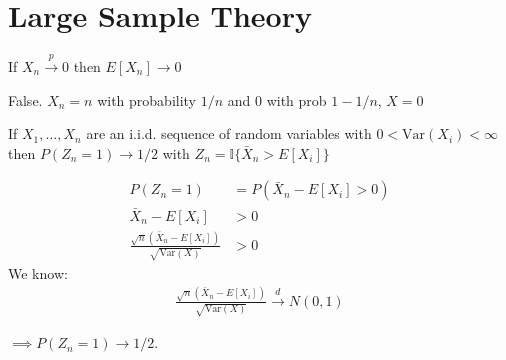 \documentclass{exam}
\begin{document}
    


\section{Large Sample Theory}
\begin{questions}
    
\question If $X_n \xrightarrow{p} 0$ then $E[X_n] \rightarrow 0$
\begin{solution}
False. $X_n = n$ with probability $1/n$ and 0 with prob $1 - 1/n$,  $X = 0$
\end{solution}



\question If $X_1,...,X_n$ are an i.i.d. sequence of random variables with $0 < \text{Var}(X_i) < \infty$ then 
$P(Z_n = 1) \rightarrow 1/2$ with $Z_n = \mathbb{I}\{\bar{X}_n > E[X_i]\}$


\begin{solution}
    \begin{align*}
    P(Z_n = 1) &= P(\bar{X}_n - E[X_i] > 0) \\
    \bar{X}_n - E[X_i] &> 0 \\
    \frac{
        \sqrt{n}(\bar{X}_n - E[X_i])
    }{
        \sqrt{\text{Var}(X)}
    } &> 0 
    \end{align*}
    We know:
    \begin{align*}
    \frac{
        \sqrt{n}(\bar{X}_n - E[X_i])
    }{
        \sqrt{\text{Var}(X)}
    } \xrightarrow{d} N(0, 1)
    \end{align*}

    $\implies P(Z_n = 1) \rightarrow 1/2$.
\end{solution}

\end{questions}
\end{document}
